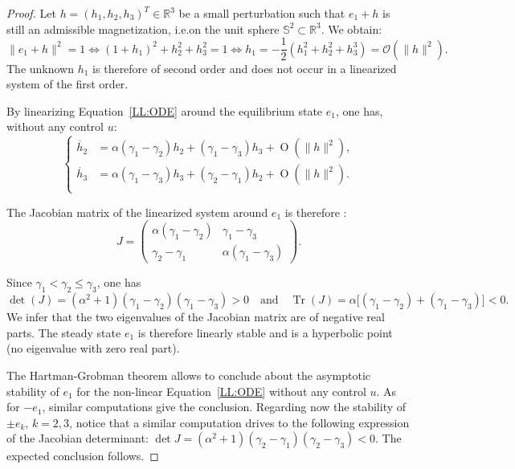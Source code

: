 \documentclass[10pt]{amsart}
\newcommand{\ie}{i.e.}
\theoremstyle{definition}
\newcommand{\R} {\mathbb{R}}
\begin{document}
\begin{proof}
Let $h=(h_1, h_2, h_3)^T\in\R^3$ be a small perturbation such that $e_1+h$ is still an admissible magnetization, \ie on the unit sphere $\mathbb{S}^2\subset\R^3$. We obtain:
\begin{equation*}
\|e_1+h\|^2=1\iff (1+h_1)^2+h_2^2+h_3^2=1
\iff h_1=-\frac{1}{2}\left(h_1^2+h_2^2+h_3^3\right)=\mathcal{O}(\|h\|^2).
\end{equation*}
The unknown $h_1$ is therefore of second order and does not occur in a linearized system of the first order.

By linearizing Equation~\eqref{LL:ODE} around the equilibrium state $e_1$, one has, without any control $u$:
\begin{equation}
\left\{
\begin{aligned}
\dot{h_2} & =\alpha(\gamma_1-\gamma_2)h_2+(\gamma_1-\gamma_3)h_3+\operatorname{O}(\|h\|^2),\\
\dot{h_3} & =\alpha(\gamma_1-\gamma_3)h_3+(\gamma_2-\gamma_1)h_2+\operatorname{O}(\|h\|^2).\\
\end{aligned}
\right.
\end{equation}

The Jacobian matrix of the linearized system around $e_1$ is therefore :
\[ J=\begin{pmatrix}\alpha(\gamma_1-\gamma_2)&\gamma_1-\gamma_3\\
\gamma_2-\gamma_1&\alpha(\gamma_1-\gamma_3)\end{pmatrix}.\]

Since $\gamma_1<\gamma_2\leq\gamma_3$, one has
\[
\det (J)\!=\!(\alpha^2+1)(\gamma_1-\gamma_2)(\gamma_1-\gamma_3)\!>\!0\quad \text{and}\quad
\operatorname{Tr}(J)\!=\!\alpha\bigl[(\gamma_1-\gamma_2)+(\gamma_1-\gamma_3)\bigr]\!<\!0.
\]
We infer that the two eigenvalues of the Jacobian matrix are of negative real parts. The steady state $e_1$ is therefore linearly stable and is {a hyperbolic point} (no eigenvalue with zero real part).

{The Hartman-Grobman theorem} \cite{perko2013differential} allows to conclude about the asymptotic stability of $e_1$ for the non-linear Equation~\eqref{LL:ODE} without any control $u$. As for $- e_1$, similar computations give the conclusion. Regarding now the stability of $\pm e_k$, $k=2,3$, notice that a similar computation drives to the following expression of the Jacobian determinant: $\det J=(\alpha^2+1)(\gamma_2-\gamma_1)(\gamma_2-\gamma_3)<0$. The expected conclusion follows.
\end{proof}
\end{document}
